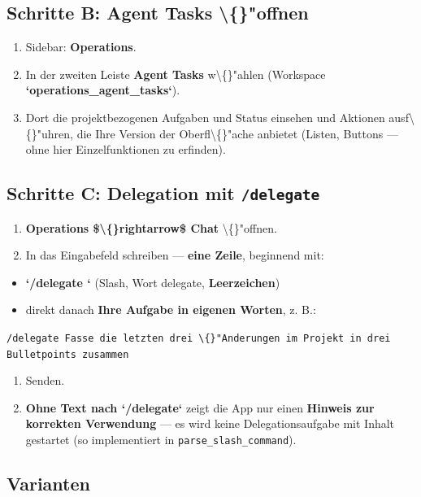 \subsection{Schritte B: Agent Tasks \textbackslash\{\}"offnen}

\begin{enumerate}
\item Sidebar: \textbf{Operations}.
\item In der zweiten Leiste \textbf{Agent Tasks} w\textbackslash\{\}"ahlen (Workspace \textbf{`operations\_agent\_tasks`}).
\item Dort die projektbezogenen Aufgaben und Status einsehen und Aktionen ausf\textbackslash\{\}"uhren, die Ihre Version der Oberfl\textbackslash\{\}"ache anbietet (Listen, Buttons --- ohne hier Einzelfunktionen zu erfinden).
\end{enumerate}

\subsection{Schritte C: Delegation mit \texttt{/delegate}}

\begin{enumerate}
\item \textbf{Operations \$\textbackslash\{\}rightarrow\$ Chat} \textbackslash\{\}"offnen.
\item In das Eingabefeld schreiben --- \textbf{eine Zeile}, beginnend mit:
\end{enumerate}

\begin{itemize}
\item \textbf{`/delegate `} (Slash, Wort delegate, \textbf{Leerzeichen})
\item direkt danach \textbf{Ihre Aufgabe in eigenen Worten}, z. B.:
\end{itemize}

     \texttt{/delegate Fasse die letzten drei \textbackslash\{\}"Anderungen im Projekt in drei Bulletpoints zusammen}
\begin{enumerate}
\item Senden.
\item \textbf{Ohne Text nach `/delegate`} zeigt die App nur einen \textbf{Hinweis zur korrekten Verwendung} --- es wird keine Delegationsaufgabe mit Inhalt gestartet (so implementiert in \texttt{parse\_slash\_command}).
\end{enumerate}

\subsection{Varianten}

